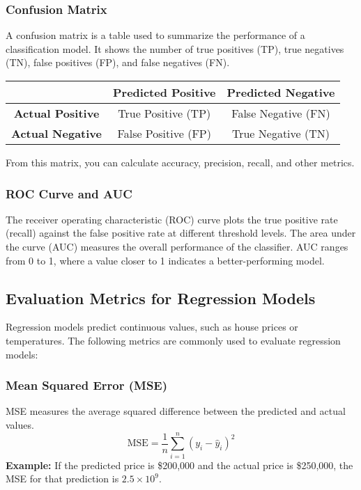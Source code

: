 \documentclass[11pt,spanish]{article}
\begin{document}
\begin{multicols}{2}
\subsubsection{Confusion Matrix}
A confusion matrix is a table used to summarize the performance of a classification model. It shows the number of true positives (TP), true negatives (TN), false positives (FP), and false negatives (FN).

\begin{center}
\begin{tabular}{|c|c|c|}
\hline
 & \textbf{Predicted Positive} & \textbf{Predicted Negative} \\
\hline
\textbf{Actual Positive} & True Positive (TP) & False Negative (FN) \\
\hline
\textbf{Actual Negative} & False Positive (FP) & True Negative (TN) \\
\hline
\end{tabular}
\end{center}

From this matrix, you can calculate accuracy, precision, recall, and other metrics.

\subsubsection{ROC Curve and AUC}
The receiver operating characteristic (ROC) curve plots the true positive rate (recall) against the false positive rate at different threshold levels. The area under the curve (AUC) measures the overall performance of the classifier. AUC ranges from 0 to 1, where a value closer to 1 indicates a better-performing model.

\subsection{Evaluation Metrics for Regression Models}
Regression models predict continuous values, such as house prices or temperatures. The following metrics are commonly used to evaluate regression models:

\subsubsection{Mean Squared Error (MSE)}
MSE measures the average squared difference between the predicted and actual values.
\[
\text{MSE} = \frac{1}{n} \sum_{i=1}^{n} (y_i - \hat{y}_i)^2
\]
\textbf{Example:} If the predicted price is \$200,000 and the actual price is \$250,000, the MSE for that prediction is $2.5 \times 10^9$.


\end{multicols}
\end{document}
